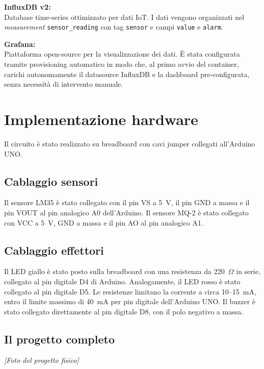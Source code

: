 \documentclass{article}
\begin{document}
\textbf{InfluxDB v2:}\\
Database time-series ottimizzato per dati IoT. I dati vengono organizzati nel
\textit{measurement} \texttt{sensor\_reading} con tag \texttt{sensor} e campi
\texttt{value} e \texttt{alarm}.

\textbf{Grafana:}\\
Piattaforma open-source per la visualizzazione dei dati. È stata configurata
tramite provisioning automatico in modo che, al primo avvio del container, carichi
autonomamente il datasource InfluxDB e la dashboard pre-configurata, senza
necessità di intervento manuale.

\section{Implementazione hardware}

Il circuito è stato realizzato su breadboard con cavi jumper collegati
all'Arduino UNO.

\subsection{Cablaggio sensori}

Il sensore LM35 è stato collegato con il pin VS a 5~V, il pin GND a massa e
il pin VOUT al pin analogico A0 dell'Arduino. Il sensore MQ-2 è stato collegato
con VCC a 5~V, GND a massa e il pin AO al pin analogico A1.

\subsection{Cablaggio effettori}

Il LED giallo è stato posto sulla breadboard con una resistenza da 220~$\Omega$
in serie, collegato al pin digitale D4 di Arduino. Analogamente, il LED rosso è
stato collegato al pin digitale D5. Le resistenze limitano la corrente a circa
10--15~mA, entro il limite massimo di 40~mA per pin digitale dell'Arduino UNO.
Il buzzer è stato collegato direttamente al pin digitale D8, con il polo negativo
a massa.

\subsection{Il progetto completo}

\begin{center}
\textit{[Foto del progetto fisico]}
\end{center}
\end{document}
